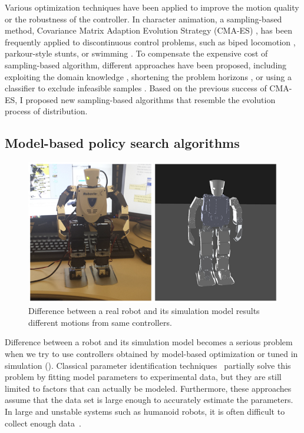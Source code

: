 Various optimization techniques have been applied to improve the
motion quality or the robustness of the controller.  In character
animation, a sampling-based method, Covariance Matrix Adaption
Evolution Strategy (CMA-ES) \cite{Hansen:2004:CMA}, has been
frequently applied to discontinuous control problems, such as biped
locomotion \cite{Wang:2009:OWC,Wang:2010:OWC,Wang:2012:OLC},
parkour-style stunts\cite{Liu:2012:TRC,Ha:2014:ITD}, or swimming
\cite{Tan:2011:ASC}.  To compensate the expensive cost of
sampling-based algorithm, different approaches have been proposed,
including exploiting the domain knowledge
\cite{Wang:2009:OWC,Wang:2010:OWC,Wang:2012:OLC}, shortening the
problem horizons \cite{Sok:2007:SBB}, or using a classifier to exclude
infeasible samples \cite{Ha:2014:ITD}. Based on the previous success
of CMA-ES, I proposed new sampling-based algorithms that resemble the
evolution process of distribution.

\subsection{Model-based policy search algorithms}
\begin{figure}[htbp]
\center
  \includegraphics[width=0.9\linewidth]{images/related_robovies.png}
  \caption{Difference between a real robot and its simulation model
  results different motions from same controllers.}
 \label{fig:related_robovies}
\end{figure}

Difference between a robot and its simulation model becomes a serious
problem when we try to use controllers obtained by model-based
optimization or tuned in simulation ().
Classical parameter identification
techniques~\cite{bib-khalil-identification} partially solve this
problem by fitting model parameters to experimental data, but they
are still limited to factors that can actually be modeled. 
Furthermore, these approaches assume that the data set is large enough
to accurately estimate the parameters.
In large and unstable systems such as humanoid robots, it is often
difficult to collect enough data~\cite{bib-humanoids2011-calibration}.


